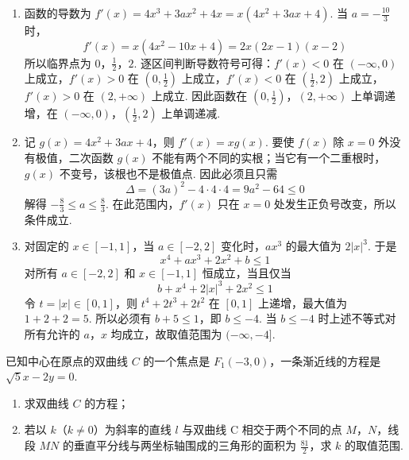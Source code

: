 \begin{solution}
\begin{enumerate}
\item 函数的导数为 \(f'(x)=4x^3+3ax^2+4x=x(4x^2+3ax+4)\). 当 \(a=-\frac{10}{3}\) 时，
\[
f'(x)=x(4x^2-10x+4)=2x(2x-1)(x-2)
\]
所以临界点为 \(0\)，\(\frac{1}{2}\)，\(2\). 逐区间判断导数符号可得：\(f'(x)<0\) 在 \((-\infty,0)\) 上成立，\(f'(x)>0\) 在 \(\left(0,\frac{1}{2}\right)\) 上成立，\(f'(x)<0\) 在 \(\left(\frac{1}{2},2\right)\) 上成立，\(f'(x)>0\) 在 \((2,+\infty)\) 上成立. 因此函数在 \((0,\frac{1}{2})\)，\((2,+\infty)\) 上单调递增，在 \((-\infty,0)\)，\(\left(\frac{1}{2},2\right)\) 上单调递减.
\item 记 \(g(x)=4x^2+3ax+4\)，则 \(f'(x)=xg(x)\). 要使 \(f(x)\) 除 \(x=0\) 外没有极值，二次函数 \(g(x)\) 不能有两个不同的实根；当它有一个二重根时，\(g(x)\) 不变号，该根也不是极值点. 因此必须且只需
\[
\Delta=(3a)^2-4\cdot4\cdot4=9a^2-64\leqslant0
\]
解得 \(-\frac{8}{3}\leqslant a\leqslant\frac{8}{3}\). 在此范围内，\(f'(x)\) 只在 \(x=0\) 处发生正负号改变，所以条件成立.
\item 对固定的 \(x\in[-1,1]\)，当 \(a\in[-2,2]\) 变化时，\(ax^3\) 的最大值为 \(2|x|^3\). 于是
\[
x^4+ax^3+2x^2+b\leqslant1
\]
对所有 \(a\in[-2,2]\) 和 \(x\in[-1,1]\) 恒成立，当且仅当
\[
b+x^4+2|x|^3+2x^2\leqslant1
\]
令 \(t=|x|\in[0,1]\)，则 \(t^4+2t^3+2t^2\) 在 \([0,1]\) 上递增，最大值为 \(1+2+2=5\). 所以必须有 \(b+5\leqslant1\)，即 \(b\leqslant-4\). 当 \(b\leqslant-4\) 时上述不等式对所有允许的 \(a\)，\(x\) 均成立，故取值范围为 \((-\infty,-4]\).
\end{enumerate}
\end{solution}

\begin{problem}
已知中心在原点的双曲线 \(C\) 的一个焦点是 \(F_{1}(-3,0)\)，一条渐近线的方程是 \(\sqrt{5} x - 2y = 0\).
\begin{enumerate}
\item 求双曲线 \(C\) 的方程；
\item 若以 \(k\)（\(k \neq 0\)）为斜率的直线 \(l\) 与双曲线 C 相交于两个不同的点 \(M\)，\(N\)，线段 \(MN\) 的垂直平分线与两坐标轴围成的三角形的面积为 \(\frac{81}{2}\)，求 \(k\) 的取值范围.
\end{enumerate}
\end{problem}

